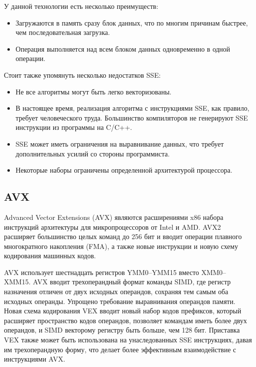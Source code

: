 У данной технологии есть несколько преимуществ:
\begin{itemize}
	\item Загружаются в память сразу блок данных, что по многим причинам быстрее, чем последовательная загрузка.
	\item Операция выполняется над всем блоком данных одновременно в одной операции.
\end{itemize}

Стоит также упомянуть несколько недостатков SSE:
\begin{itemize}
	\item Не все алгоритмы могут быть легко векторизованы.
	\item В настоящее время, реализация алгоритма с инструкциями SSE, как правило, требует человеческого труда. Большинство компиляторов не генерируют SSE инструкции из программы на C/C++.
	\item SSE может иметь ограничения на выравнивание данных, что требует дополнительных усилий со стороны программиста.
	\item Некоторые наборы ограничены определенной архитектурой процессора.
\end{itemize}



\subsection{AVX}
Advanced Vector Extensions (AVX) являются расширениями x86 набора инструкций архитектуры для микропроцессоров от Intel и AMD\cite{bib2}.  AVX2 расширяет большинство целых команд до 256 бит и вводит операции плавного многократного накопления (FMA), а также новые инструкции и новую схему кодирования машинных кодов.

AVX использует шестнадцать регистров YMM0--YMM15 вместо XMM0--XMM15. AVX вводит трехоперандный формат команды SIMD, где регистр назначения отличен от двух исходных операндов, сохраняя тем самым оба исходных операнды.
Упрощено требование выравнивания операндов памяти\cite{bib2}. Новая схема кодирования VEX вводит новый набор кодов префиксов, который расширяет пространство кодов операндов, позволяет командам иметь более двух операндов, и SIMD векторому регистру быть больше, чем 128 бит. Приставка VEX также может быть использована на унаследованных SSE инструкциях, давая им трехоперандную форму, что делает более эффективным взаимодействие с инструкциями AVX.

